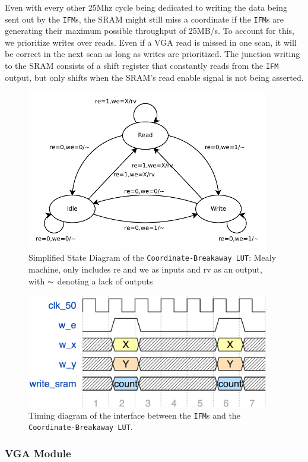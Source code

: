 \documentclass{article}
\begin{document}
Even with every other 25Mhz cycle being dedicated to writing the data being sent out by the \texttt{IFM}s, the SRAM might
still miss a coordinate if the \texttt{IFM}s are generating their maximum possible throughput of 25MB/s. To account for this, 
we prioritize writes over reads. Even if a VGA read is missed in one scan, it will be correct in the next scan as long as writes are prioritized. The junction writing to the SRAM consists of a shift register that 
constantly reads from the \texttt{IFM} output, but only shifts when the SRAM's read enable signal is not being asserted. 

\begin{figure}[H]
  \centering
    \includegraphics[width=300pt]{state_diagrams/clut.pdf}
  \caption{Simplified State Diagram of the \texttt{Coordinate-Breakaway LUT}:
    Mealy machine, only includes re and we as inputs and rv as an
    output, with $\thicksim$ denoting a lack of outputs}
\end{figure}

\begin{figure}[H]
  \centering
    \includegraphics[width=300pt]{timing_diagrams/ifm_clut.pdf}
  \caption{Timing diagram of the interface between the \texttt{IFM}s and the \texttt{Coordinate-Breakaway LUT}.}
\end{figure}


\subsubsection{VGA Module}
\end{document}
